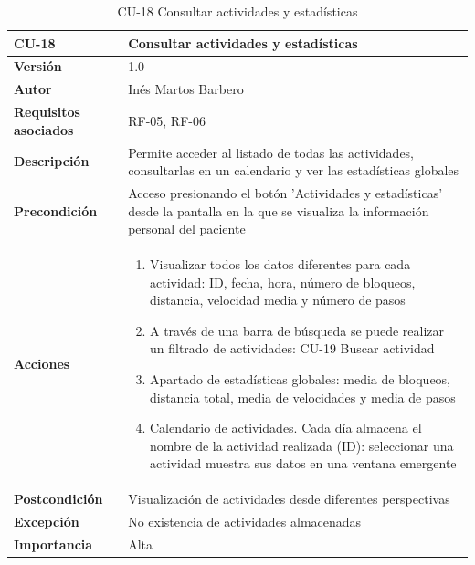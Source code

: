 \begin{table}[p]
	\centering
	\begin{tabularx}{\linewidth}{ p{} p{} }
		\toprule
		\textbf{CU-18}    & \textbf{Consultar actividades y estadísticas}\\
		\toprule
		\textbf{Versión}              & 1.0    \\
		\textbf{Autor}                & Inés Martos Barbero \\
		\textbf{Requisitos asociados} & RF-05, RF-06 \\
		\textbf{Descripción}          & Permite acceder al listado de todas las actividades, consultarlas en un calendario y ver las estadísticas globales \\
		\textbf{Precondición}         & Acceso presionando el botón 'Actividades y estadísticas' desde la pantalla en la que se visualiza la información personal del paciente \\
		\textbf{Acciones}             &
		\begin{enumerate}
			\def\labelenumi{\arabic{enumi}.}
			\tightlist
			\item Visualizar todos los datos diferentes para cada actividad: ID, fecha, hora, número de bloqueos, distancia, velocidad media y número de pasos
            \item A través de una barra de búsqueda se puede realizar un filtrado de actividades: CU-19 Buscar actividad
            \item Apartado de estadísticas globales: media de bloqueos, distancia total, media de velocidades y media de pasos
			\item Calendario de actividades. Cada día almacena el nombre de la actividad realizada (ID): seleccionar una actividad muestra sus datos en una ventana emergente
		\end{enumerate}\\
		\textbf{Postcondición}        &  Visualización de actividades desde diferentes perspectivas\\
		\textbf{Excepción}          & No existencia de actividades almacenadas \\
		\textbf{Importancia}          & Alta  \\
		\bottomrule
	\end{tabularx}
	\caption{CU-18 Consultar actividades y estadísticas}
    \label{CU-18}
\end{table}

